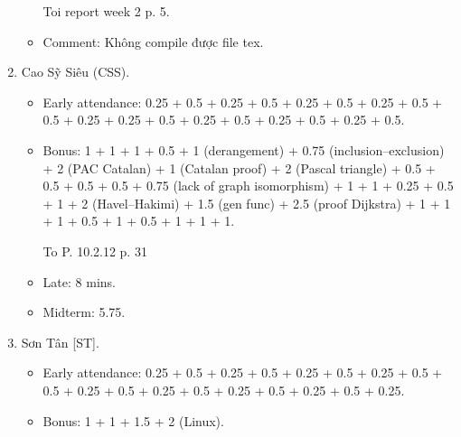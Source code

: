 \documentclass{article}
\begin{document}
\begin{enumerate}
\begin{itemize}
        Toi report week 2 p. 5.
        \item Comment: Không compile được file tex.
	\end{itemize}
	\item {\sc Cao Sỹ Siêu (CSS).}
	\begin{itemize}
		\item Early attendance: 0.25 + 0.5 + 0.25 + 0.5 + 0.25 + 0.5 + 0.25 + 0.5 + 0.5 + 0.25 + 0.25 + 0.5 + 0.25 + 0.5 + 0.25 + 0.5 + 0.25 + 0.5.
		\item Bonus: 1 + 1 + 1 + 0.5 + 1 (derangement) + 0.75 (inclusion--exclusion) + 2 (PAC Catalan) + 1 (Catalan proof) + 2 (Pascal triangle) + 0.5 + 0.5 + 0.5 + 0.5 + 0.75 (lack of graph isomorphism) + 1 + 1 + 0.25 + 0.5 + 1 + 2 (Havel--Hakimi) + 1.5 (gen func) + 2.5 (proof Dijkstra) + 1 + 1 + 1 + 0.5 + 1 + 0.5 + 1 + 1 + 1.

        To P. 10.2.12 p. 31
		\item Late: 8 mins.
        \item Midterm: 5.75.
	\end{itemize}
	\item {\sc Sơn Tân [ST].}
	\begin{itemize}
		\item Early attendance: 0.25 + 0.5 + 0.25 + 0.5 + 0.25 + 0.5 + 0.25 + 0.5 + 0.5 + 0.25 + 0.5 + 0.25 + 0.5 + 0.25 + 0.5 + 0.25 + 0.5 + 0.25.
		\item Bonus: 1 + 1 + 1.5 + 2 (Linux).


\end{itemize}
\end{enumerate}
\end{document}
